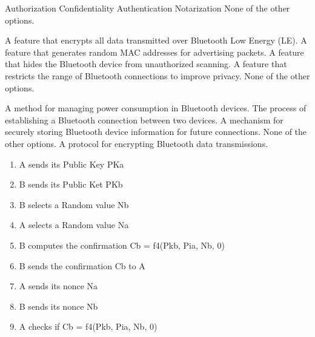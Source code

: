 \begin{questions}
    \begin{checkboxes}
        \CorrectChoice Authorization
        \CorrectChoice Confidentiality
        \CorrectChoice Authentication
        \choice Notarization
        \choice None of the other options.
    \end{checkboxes}




    \begin{checkboxes}
        \choice A feature that encrypts all data transmitted over Bluetooth Low Energy (LE).
        \CorrectChoice A feature that generates random MAC addresses for advertising packets.
        \choice A feature that hides the Bluetooth device from unauthorized scanning.
        \choice A feature that restricts the range of Bluetooth connections to improve privacy.
        \choice None of the other options.
    \end{checkboxes}


    \begin{checkboxes}
        \choice A method for managing power consumption in Bluetooth devices.
        \CorrectChoice The process of establishing a Bluetooth connection between two devices.
        \choice A mechanism for securely storing Bluetooth device information for future connections.
        \choice None of the other options.
        \choice A protocol for encrypting Bluetooth data transmissions.
    \end{checkboxes}


    \begin{solution}
        \begin{enumerate}
            \item A sends its Public Key PKa
            \item B sends its Public Ket PKb
            \item B selects a Random value Nb
            \item A selects a Random value Na
            \item B computes the confirmation Cb = f4(Pkb, Pia, Nb, 0)
            \item B sends the confirmation Cb to A
            \item A sends its nonce Na
            \item B sends its nonce Nb
            \item A checks if Cb = f4(Pkb, Pia, Nb, 0)
        \end{enumerate}
    \end{solution}


\end{questions}

